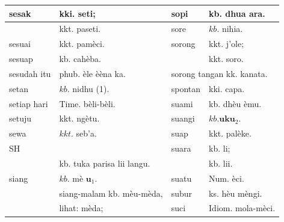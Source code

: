 \documentclass[10pt]{article}
\begin{document}
\begin{center}
\begin{tabular}{|l|l|l|l|}
\hline
\multirow[t]{2}{*}{sesak} & kki. seti; & sopi & kb. dhua ara. \\
\hline
 & kkt. paseti. & sore & \(k b\). nihia. \\
\hline
sesuai & kkt. pamèci. & sorong & kkt. j'ole; \\
\hline
sesuap & kb. cahèba. &  & kkt. soro. \\
\hline
sesudah itu & phub. èle èèna ka. & \multicolumn{2}{|l|}{sorong tangan kk. kanata.} \\
\hline
setan & \(k b\). nidhu (1). & spontan & kki. capa. \\
\hline
setiap hari & Time. bèli-bèli. & suami & kb. dhèu èmu. \\
\hline
setuju & kkt. ngètu. & suangi & \(k b . \mathbf{u k u}_{2}\). \\
\hline
sewa & \(k k t\). seb'a. & suap & kkt. palèke. \\
\hline
SH &  & suara & kb. li; \\
\hline
 & kb. tuka parisa lii langu. &  & kb. lii. \\
\hline
siang & \(k b\). mè \(\mathbf{u}_{1}\). & suatu & Num. èci. \\
\hline
\multirow{2}{*}{} & siang-malam kb. mèu-mèda, & subur & ks. hèu mèngi. \\
\hline
 & lihat: mèda; & suci & Idiom. mola-mèci. \\
\hline
\end{tabular}
\end{center}
\end{document}
